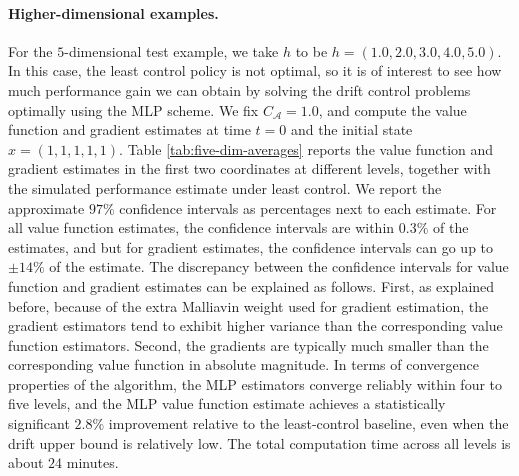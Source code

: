 \documentclass[11pt]{article}
\theoremstyle{definition}
\theoremstyle{plain}
\begin{document}

\paragraph{Higher-dimensional examples.}
For the $5$-dimensional test example, we take $h$ to be $h=(1.0, 2.0, 3.0, 4.0, 5.0)$. 
In this case, the least control policy is not optimal, so it is of interest to see how much performance gain we can obtain 
by solving the drift control problems optimally using the MLP scheme. 
We fix $C_{\mathcal{A}}=1.0$, and compute the value function and gradient estimates at time $t=0$ and the initial state $x=(1,1,1,1,1)$. 
Table \ref{tab:five-dim-averages} reports the value function and gradient estimates in the first two coordinates at different levels, together with the simulated performance estimate under least control. 
We report the approximate $97\%$ confidence intervals as percentages next to each estimate. 
For all value function estimates, the confidence intervals are within $0.3\%$ of the estimates, and 
but for gradient estimates, the confidence intervals can go up to $\pm 14\%$ of the estimate.
The discrepancy between the confidence intervals for value function and gradient estimates can be explained as follows. 
First, as explained before, because of the extra Malliavin weight used for gradient estimation, 
the gradient estimators tend to exhibit higher variance than the corresponding value function estimators. 
Second, the gradients are typically much smaller than the corresponding value function in absolute magnitude. 
In terms of convergence properties of the algorithm, the MLP estimators converge reliably within four to five levels, and the MLP value function estimate achieves a statistically significant $2.8\%$ improvement relative to the least-control baseline, 
even when the drift upper bound is relatively low. The total computation time across all levels is about $24$ minutes.
\end{document}
